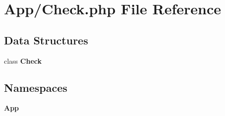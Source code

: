 \section{App/\+Check.php File Reference}
\label{_check_8php}
\subsection*{Data Structures}
\begin{DoxyCompactItemize}
\item 
class \textbf{ Check}
\end{DoxyCompactItemize}
\subsection*{Namespaces}
\begin{DoxyCompactItemize}
\item 
 \textbf{ App}
\end{DoxyCompactItemize}
